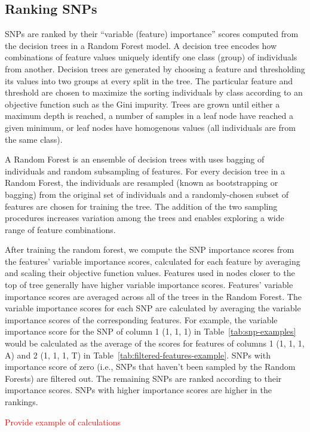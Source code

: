 \subsection{Ranking SNPs}
SNPs are ranked by their ``variable (feature) importance'' scores computed from the decision trees in a Random Forest model.  A decision tree encodes how combinations of feature values uniquely identify one class (group) of individuals from another.  Decision trees are generated by choosing a feature and thresholding its values into two groups at every split in the tree.  The particular feature and threshold are chosen to maximize the sorting individuals by class according to an objective function such as the Gini impurity. Trees are grown until either a maximum depth is reached, a number of samples in a leaf node have reached a given minimum, or leaf nodes have homogenous values (all individuals are from the same class).

A Random Forest is an ensemble of decision trees with uses bagging of individuals and random subsampling of features.  For every decision tree in a Random Forest, the individuals are resampled (known as bootstrapping or bagging) from the original set of individuals and a randomly-chosen subset of features are chosen for training the tree. The addition of the two sampling procedures increases variation among the trees and enables exploring a wide range of feature combinations.

After training the random forest, we compute the SNP importance scores from the features' variable importance scores, calculated for each feature by averaging and scaling their objective function values.  Features used in nodes closer to the top of tree generally have higher variable importance scores.  Features' variable importance scores are averaged across all of the trees in the Random Forest.  The variable importance scores for each SNP are calculated by averaging the variable importance scores of the corresponding features.  For example, the variable importance score for the SNP of column 1 (1, 1, 1) in Table~\ref{tab:snp-examples} would be calculated as the average of the scores for features of columns 1 (1, 1, 1, A) and 2 (1, 1, 1, T) in Table~\ref{tab:filtered-features-example}.  SNPs with importance score of zero (i.e., SNPs that haven't been sampled by the Random Forests) are filtered out.  The remaining SNPs are ranked according to their importance scores.  SNPs with higher importance scores are higher in the rankings.

\textcolor{red}{Provide example of calculations}



